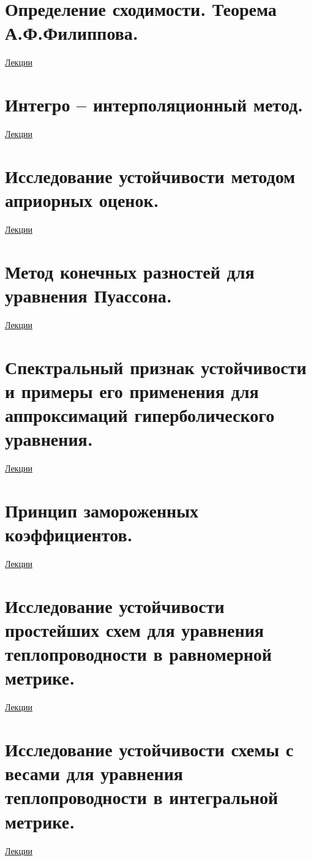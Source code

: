 \documentclass[specialist, subf, href, colorlinks=true, 12pt, times, mtpro, final]{disser}
\theoremstyle{definition}
\begin{document}
\section {Определение сходимости. Теорема А.Ф.Филиппова.}
	\hyperlink {lects.120}{Лекции}\\

\section {Интегро -- интерполяционный метод.}
	\hyperlink {lects.121}{Лекции}\\

\section {Исследование устойчивости методом априорных оценок.}
	\hyperlink {lects.125}{Лекции}\\

\section {Метод конечных разностей для уравнения Пуассона.}
	\hyperlink {lects.128}{Лекции}\\

\section {Спектральный признак устойчивости и примеры его применения для аппроксимаций гиперболического уравнения.}
	\hyperlink {lects.130}{Лекции}\\

\section {Принцип замороженных коэффициентов.}
	\hyperlink {lects.132}{Лекции}\\

\section {Исследование устойчивости простейших схем для уравнения теплопроводности в равномерной метрике.}
	\hyperlink {lects.134}{Лекции}\\

\section {Исследование устойчивости схемы с весами для уравнения теплопроводности в интегральной метрике.}
	\hyperlink {lects.136}{Лекции}\\





\end{document}
